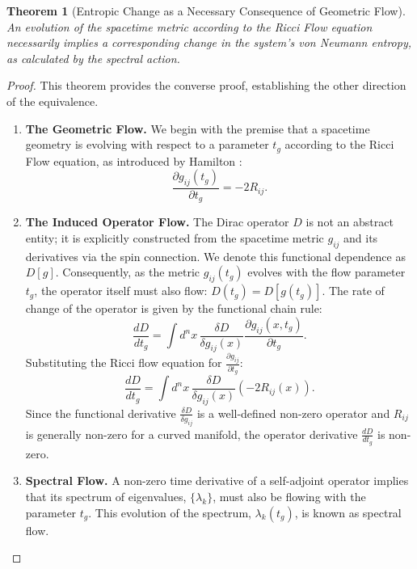 \documentclass[11pt, letterpaper]{report}
\theoremstyle{plain} %
\newtheorem{theorem}{Theorem}[chapter]
\theoremstyle{definition} %
\theoremstyle{remark} %
\begin{document}
\begin{theorem}[Entropic Change as a Necessary Consequence of Geometric Flow]
\label{thm:entropic_from_geometric}
An evolution of the spacetime metric according to the Ricci Flow equation necessarily implies a corresponding change in the system's von Neumann entropy, as calculated by the spectral action.
\end{theorem}
\begin{proof}
This theorem provides the converse proof, establishing the other direction of the equivalence.

\begin{enumerate}
    \item \textbf{The Geometric Flow.} We begin with the premise that a spacetime geometry is evolving with respect to a parameter $t_g$ according to the Ricci Flow equation, as introduced by Hamilton \cite{Hamilton1982RicciFlow}:
    \begin{equation}
        \frac{\partial g_{ij}(t_g)}{\partial t_g} = -2R_{ij}.
    \end{equation}

    \item \textbf{The Induced Operator Flow.} The Dirac operator $D$ is not an abstract entity; it is explicitly constructed from the spacetime metric $g_{ij}$ and its derivatives via the spin connection. We denote this functional dependence as $D[g]$. Consequently, as the metric $g_{ij}(t_g)$ evolves with the flow parameter $t_g$, the operator itself must also flow: $D(t_g) = D[g(t_g)]$. The rate of change of the operator is given by the functional chain rule:
    \begin{equation}
        \frac{dD}{dt_g} = \int d^nx \, \frac{\delta D}{\delta g_{ij}(x)} \frac{\partial g_{ij}(x, t_g)}{\partial t_g}.
    \end{equation}
    Substituting the Ricci flow equation for $\frac{\partial g_{ij}}{\partial t_g}$:
    \begin{equation}
        \frac{dD}{dt_g} = \int d^nx \, \frac{\delta D}{\delta g_{ij}(x)} (-2R_{ij}(x)).
    \end{equation}
    Since the functional derivative $\frac{\delta D}{\delta g_{ij}}$ is a well-defined non-zero operator and $R_{ij}$ is generally non-zero for a curved manifold, the operator derivative $\frac{dD}{dt_g}$ is non-zero.

    \item \textbf{Spectral Flow.} A non-zero time derivative of a self-adjoint operator implies that its spectrum of eigenvalues, $\{\lambda_k\}$, must also be flowing with the parameter $t_g$. This evolution of the spectrum, $\lambda_k(t_g)$, is known as spectral flow.


\end{enumerate}
\end{proof}
\end{document}

